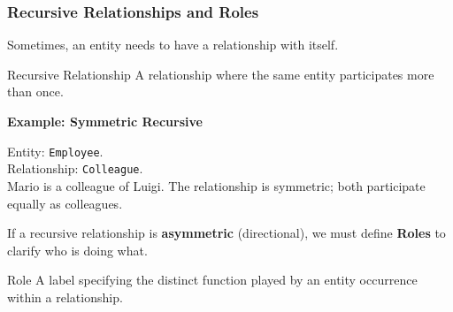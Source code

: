\subsubsection{Recursive Relationships and Roles}
Sometimes, an entity needs to have a relationship with itself.

\begin{defbox}{Recursive Relationship}
A relationship where the same entity participates more than once.
\end{defbox}

\vspace{0.2cm}
\begin{example}{\textbf{Example: Symmetric Recursive}}



\vspace{0.2cm}
Entity: \texttt{Employee}.\\
Relationship: \texttt{Colleague}.\\
Mario is a colleague of Luigi. The relationship is symmetric; both participate equally as colleagues.

\vs

\begin{center}
\end{center}
\end{example}

If a recursive relationship is \textbf{asymmetric} (directional), we must define \textbf{Roles} to clarify who is doing what.

\begin{defbox}{Role}
A label specifying the distinct function played by an entity occurrence within a relationship.
\end{defbox}

